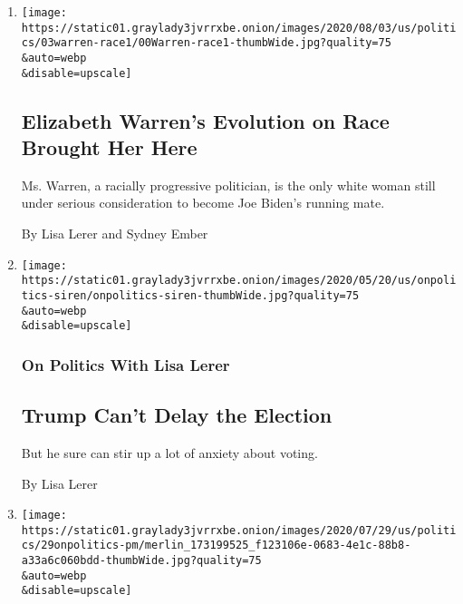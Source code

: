 \begin{enumerate}
\def\labelenumi{\arabic{enumi}.}
\item
  \href{/2020/08/02/us/politics/elizabeth-warren-biden-vice-president.html}{}

  \texttt{[image: https://static01.graylady3jvrrxbe.onion/images/2020/08/03/us/politics/03warren-race1/00Warren-race1-thumbWide.jpg?quality=75\\\&auto=webp\\\&disable=upscale]}

  \hypertarget{elizabeth-warrens-evolution-on-race-brought-her-here}{%
  \subsection{Elizabeth Warren's Evolution on Race Brought Her
  Here}\label{elizabeth-warrens-evolution-on-race-brought-her-here}}

  Ms. Warren, a racially progressive politician, is the only white woman
  still under serious consideration to become Joe Biden's running mate.

  By Lisa Lerer and Sydney Ember
\item
  \href{/2020/07/30/us/politics/trump-election-delay-distraction.html}{}

  \texttt{[image: https://static01.graylady3jvrrxbe.onion/images/2020/05/20/us/onpolitics-siren/onpolitics-siren-thumbWide.jpg?quality=75\\\&auto=webp\\\&disable=upscale]}

  \hypertarget{on-politics-with-lisa-lerer}{%
  \subsubsection{On Politics With Lisa
  Lerer}\label{on-politics-with-lisa-lerer}}

  \hypertarget{trump-cant-delay-the-election}{%
  \subsection{Trump Can't Delay the
  Election}\label{trump-cant-delay-the-election}}

  But he sure can stir up a lot of anxiety about voting.

  By Lisa Lerer
\item
  \href{/2020/07/29/us/politics/patty-murray-schools-reopening.html}{}

  \texttt{[image: https://static01.graylady3jvrrxbe.onion/images/2020/07/29/us/politics/29onpolitics-pm/merlin\_173199525\_f123106e-0683-4e1c-88b8-a33a6c060bdd-thumbWide.jpg?quality=75\\\&auto=webp\\\&disable=upscale]}


\end{enumerate}
